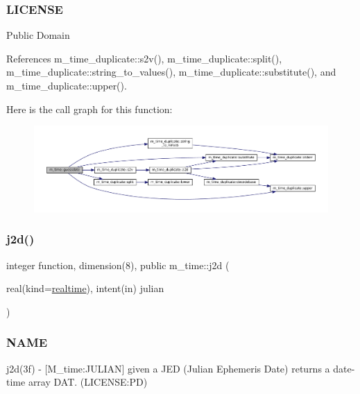 \subsubsection*{L\+I\+C\+E\+N\+SE}

Public Domain 

References m\+\_\+time\+\_\+duplicate\+::s2v(), m\+\_\+time\+\_\+duplicate\+::split(), m\+\_\+time\+\_\+duplicate\+::string\+\_\+to\+\_\+values(), m\+\_\+time\+\_\+duplicate\+::substitute(), and m\+\_\+time\+\_\+duplicate\+::upper().

Here is the call graph for this function\+:\nopagebreak
\begin{figure}[H]
\begin{center}
\leavevmode
\includegraphics[width=350pt]{namespacem__time_aa5198c7aa4f3d8411c8ce93046ce3794_cgraph}
\end{center}
\end{figure}
\mbox{\label{namespacem__time_a3ad5cad6df02c53e0429c3602a072e3c}} 
\subsubsection{\texorpdfstring{j2d()}{j2d()}}
{\footnotesize\ttfamily integer function, dimension(8), public m\+\_\+time\+::j2d (\begin{DoxyParamCaption}\item[{real(kind=\mbox{\hyperlink{namespacem__time_ac10ea9e8d59ec74eaa7d89f2517d7422}{realtime}}), intent(in)}]{julian }\end{DoxyParamCaption})}



\subsubsection*{N\+A\+ME}

j2d(3f) -\/ \mbox{[}M\+\_\+time\+:J\+U\+L\+I\+AN\mbox{]} given a J\+ED (Julian Ephemeris Date) returns a date-\/time array D\+AT. (L\+I\+C\+E\+N\+SE\+:PD) 

